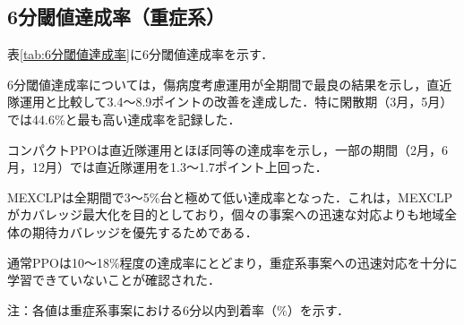 \subsection{6分閾値達成率（重症系）}
表\ref{tab:6分閾値達成率}に6分閾値達成率を示す．

6分閾値達成率については，傷病度考慮運用が全期間で最良の結果を示し，直近隊運用と比較して3.4～8.9ポイントの改善を達成した．特に閑散期（3月，5月）では44.6\%と最も高い達成率を記録した．

コンパクトPPOは直近隊運用とほぼ同等の達成率を示し，一部の期間（2月，6月，12月）では直近隊運用を1.3～1.7ポイント上回った．

MEXCLPは全期間で3～5\%台と極めて低い達成率となった．これは，MEXCLPがカバレッジ最大化を目的としており，個々の事案への迅速な対応よりも地域全体の期待カバレッジを優先するためである．

通常PPOは10～18\%程度の達成率にとどまり，重症系事案への迅速対応を十分に学習できていないことが確認された．

\begin{table}
    \centering
    \caption{重症系事案の6分閾値達成率（\%）}
    \label{tab:6分閾値達成率}
    \footnotesize
    \begin{flushleft}
    注：各値は重症系事案における6分以内到着率（\%）を示す．
    \end{flushleft}
\end{table}
\clearpage

